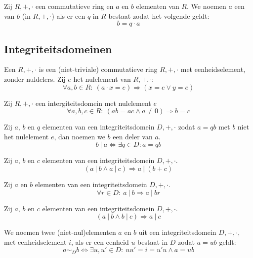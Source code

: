 \documentclass[main.tex]{subfiles}
\begin{document}
\begin{de}
  Zij $R,+,\cdot$ een commutatieve ring en $a$ en $b$ elementen van $R$.
  We noemen $a$ een  van $b$ (in $R,+,\cdot$) als er een $q$ in $R$ bestaat zodat het volgende geldt:
  \[ b = q \cdot a \]
\end{de}

\subsection{Integriteitsdomeinen}
\label{sec:integriteitsdomeinen}

\begin{de}
  Een  $R,+,\cdot$ is een (niet-triviale) commutatieve ring $R,+,\cdot$ met eenheidselement, zonder nuldelers.
  Zij $e$ het nulelement van $R,+,\cdot$:
  \[ \forall a, b \in R:\ (a \cdot x = e) \Rightarrow (x = e \vee y = e) \]
\end{de}

\begin{ei}
  Zij $R,+,\cdot$ een intergiteitsdomein met nulelement $e$
  \[ \forall a,b,c \in R:\ (ab = ac \wedge a \neq 0) \Rightarrow b = c \]
\end{ei}

\begin{de}
  Zij $a$, $b$ en $q$ elementen van een integriteitsdomein $D,+,\cdot$ zodat $a= qb$ met $b$ niet het nulelement $e$, dan noemen we $b$ een deler van $a$.
  \[ b\ |\ a \Leftrightarrow \exists q \in D: a = qb \]
\end{de}

\begin{st}
  Zij $a$, $b$ en $c$ elementen van een integriteitsdomein $D,+,\cdot$.
  \[ (a\ |\ b \wedge a\ |\ c) \Rightarrow a\ |\ (b+c) \]
\end{st}

\begin{st}
  Zij $a$ en $b$ elementen van een integriteitsdomein $D,+,\cdot$.
  \[ \forall r \in D:\ a\ |\ b \Rightarrow a\ |\ br  \]
\end{st}

\begin{st}
  Zij $a$, $b$ en $c$ elementen van een integriteitsdomein $D,+,\cdot$.
  \[ (a\ |\ b \wedge b\ |\ c) \Rightarrow a\ |\ c \]
\end{st}

\begin{de}
  We noemen twee (niet-nul)elementen $a$ en $b$ uit een integriteitsdomein $D,+,\cdot$, met eenheidselement $i$,  als er een eenheid $u$ bestaat in $D$ zodat $a=ub$ geldt:
  \[ a \sim_{D} b \Leftrightarrow \exists u,u'\in D:\ uu'= i = u'u \wedge a = ub \]
\end{de}
\end{document}
